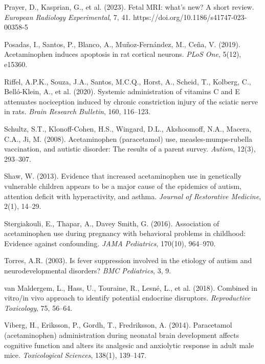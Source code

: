 \documentclass[11pt]{article}
\begin{document}
\begin{thebibliography}{99}
Prayer, D., Kasprian, G., et al. (2023).
Fetal MRI: what's new? A short review.
\textit{European Radiology Experimental}, 7, 41.
https://doi.org/10.1186/s41747-023-00358-5

Posadas, I., Santos, P., Blanco, A., Muñoz-Fernández, M., Ceña, V. (2019).
Acetaminophen induces apoptosis in rat cortical neurons.
\textit{PLoS One}, 5(12), e15360.

Riffel, A.P.K., Souza, J.A., Santos, M.C.Q., Horst, A., Scheid, T., Kolberg, C., Belló-Klein, A., et al. (2020).
Systemic administration of vitamins C and E attenuates nociception induced by chronic constriction injury of the sciatic nerve in rats.
\textit{Brain Research Bulletin}, 160, 116--123.

Schultz, S.T., Klonoff-Cohen, H.S., Wingard, D.L., Akshoomoff, N.A., Macera, C.A., Ji, M. (2008).
Acetaminophen (paracetamol) use, measles-mumps-rubella vaccination, and autistic disorder: The results of a parent survey.
\textit{Autism}, 12(3), 293--307.

Shaw, W. (2013).
Evidence that increased acetaminophen use in genetically vulnerable children appears to be a major cause of the epidemics of autism, attention deficit with hyperactivity, and asthma.
\textit{Journal of Restorative Medicine}, 2(1), 14--29.

Stergiakouli, E., Thapar, A., Davey Smith, G. (2016).
Association of acetaminophen use during pregnancy with behavioral problems in childhood: Evidence against confounding.
\textit{JAMA Pediatrics}, 170(10), 964--970.

Torres, A.R. (2003).
Is fever suppression involved in the etiology of autism and neurodevelopmental disorders?
\textit{BMC Pediatrics}, 3, 9.

van Maldergem, L., Hass, U., Touraine, R., Lesné, L., et al. (2018).
Combined in vitro/in vivo approach to identify potential endocrine disruptors.
\textit{Reproductive Toxicology}, 75, 56--64.

Viberg, H., Eriksson, P., Gordh, T., Fredriksson, A. (2014).
Paracetamol (acetaminophen) administration during neonatal brain development affects cognitive function and alters its analgesic and anxiolytic response in adult male mice.
\textit{Toxicological Sciences}, 138(1), 139--147.


\end{thebibliography}
\end{document}
